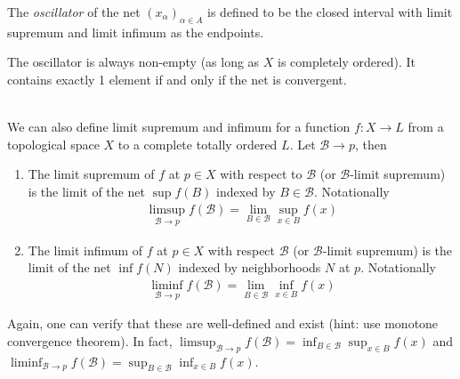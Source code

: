 \documentclass{treatise}
\begin{document}
The \emph{oscillator} of the net $(x_\alpha)_{\alpha \in A}$ is defined to be the closed interval with limit supremum and limit infimum as the endpoints.
\begin{remark}
The oscillator is always non-empty (as long as $X$ is completely ordered). It contains exactly 1 element if and only if the net is convergent.
\end{remark}
\ \\
We can also define limit supremum and infimum for a function $f: X \to L$ from a topological space $X$ to a complete totally ordered $L$. Let $\mathcal{B} \to p$, then
\begin{enumerate}
    \item The limit supremum of $f$ at $p \in X$ with respect to $\mathcal{B}$ (or $\mathcal{B}$-limit supremum) is the limit of the net $\sup f(B)$ indexed by $B \in \mathcal{B}$. Notationally
    \begin{align*}
        \limsup_{\mathcal{B} \to p} f(\mathcal{B}) = \lim_{B \in \mathcal{B}} \sup_{x \in B} f(x)
    \end{align*}
    \item The limit infimum of $f$ at $p \in X$ with respect $\mathcal{B}$ (or $\mathcal{B}$-limit supremum) is the limit of the net $\inf f(N)$ indexed by neighborhoods $N$ at $p$. Notationally
    \begin{align*}
        \liminf_{\mathcal{B} \to p} f(\mathcal{B}) = \lim_{B \in \mathcal{B}} \inf_{x \in B} f(x)
    \end{align*}
\end{enumerate}
Again, one can verify that these are well-defined and exist (hint: use monotone convergence theorem). In fact, $\limsup_{\mathcal{B} \to p} f(\mathcal{B}) = \inf_{B \in \mathcal{B}} \sup_{x \in B} f(x)$ and $\liminf_{\mathcal{B} \to p} f(\mathcal{B}) = \sup_{B \in \mathcal{B}} \inf_{x \in B} f(x)$.
\end{document}
